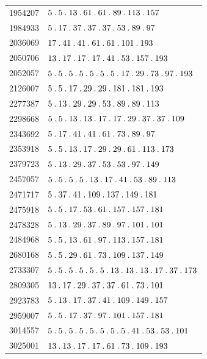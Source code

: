 \begin{longtable}{@{}r|l@{}}
1954207 & $5\pdot 5\pdot 13\pdot 61\pdot 61\pdot 89\pdot 113\pdot 157$\\
1984933 & $5\pdot 17\pdot 37\pdot 37\pdot 37\pdot 53\pdot 89\pdot 97$\\
2036069 & $17\pdot 41\pdot 41\pdot 61\pdot 61\pdot 101\pdot 193$\\
2050706 & $13\pdot 17\pdot 17\pdot 17\pdot 41\pdot 53\pdot 157\pdot 193$\\
2052057 & $5\pdot 5\pdot 5\pdot 5\pdot 5\pdot 5\pdot 5\pdot 17\pdot 29\pdot 73\pdot 97\pdot 193$\\
2126007 & $5\pdot 5\pdot 17\pdot 29\pdot 29\pdot 181\pdot 181\pdot 193$\\
2277387 & $5\pdot 13\pdot 29\pdot 29\pdot 53\pdot 89\pdot 89\pdot 113$\\
2298668 & $5\pdot 5\pdot 13\pdot 13\pdot 17\pdot 17\pdot 29\pdot 37\pdot 37\pdot 109$\\
2343692 & $5\pdot 17\pdot 41\pdot 41\pdot 61\pdot 73\pdot 89\pdot 97$\\
2353918 & $5\pdot 5\pdot 13\pdot 17\pdot 29\pdot 29\pdot 61\pdot 113\pdot 173$\\
2379723 & $5\pdot 13\pdot 29\pdot 37\pdot 53\pdot 53\pdot 97\pdot 149$\\
2457057 & $5\pdot 5\pdot 5\pdot 5\pdot 13\pdot 17\pdot 41\pdot 53\pdot 89\pdot 113$\\
2471717 & $5\pdot 37\pdot 41\pdot 109\pdot 137\pdot 149\pdot 181$\\
2475918 & $5\pdot 5\pdot 17\pdot 53\pdot 61\pdot 157\pdot 157\pdot 181$\\
2478328 & $5\pdot 13\pdot 29\pdot 37\pdot 89\pdot 97\pdot 101\pdot 101$\\
2484968 & $5\pdot 5\pdot 13\pdot 61\pdot 97\pdot 113\pdot 157\pdot 181$\\
2680168 & $5\pdot 5\pdot 29\pdot 61\pdot 73\pdot 109\pdot 137\pdot 149$\\
2733307 & $5\pdot 5\pdot 5\pdot 5\pdot 5\pdot 5\pdot 13\pdot 13\pdot 13\pdot 17\pdot 37\pdot 173$\\
2809305 & $13\pdot 17\pdot 29\pdot 37\pdot 37\pdot 61\pdot 73\pdot 101$\\
2923783 & $5\pdot 13\pdot 17\pdot 37\pdot 41\pdot 109\pdot 149\pdot 157$\\
2959007 & $5\pdot 5\pdot 17\pdot 37\pdot 97\pdot 101\pdot 157\pdot 181$\\
3014557 & $5\pdot 5\pdot 5\pdot 5\pdot 5\pdot 5\pdot 5\pdot 5\pdot 41\pdot 53\pdot 53\pdot 101$\\
3025001 & $13\pdot 13\pdot 17\pdot 17\pdot 61\pdot 73\pdot 109\pdot 193$\\

\end{longtable}
